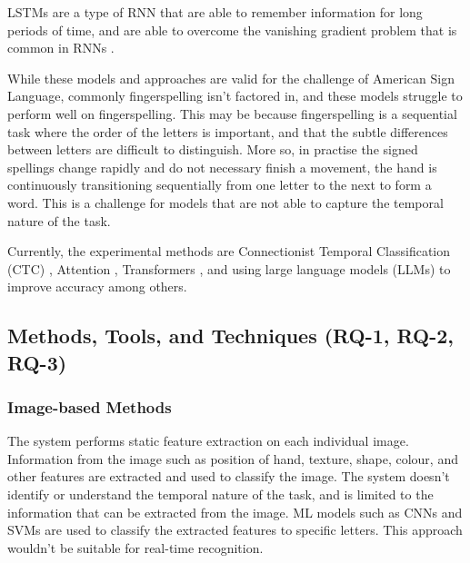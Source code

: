 LSTMs are a type of RNN that are able to remember information for long periods of time, and are able to overcome the vanishing gradient problem that is common in RNNs \cite{sherstinskyFundamentalsRecurrentNeural2020}.


While these models and approaches are valid for the challenge of American Sign Language, commonly fingerspelling isn't factored in, and these models struggle to perform well on fingerspelling. This may be because fingerspelling is a sequential task where the order of the letters is important, and that the subtle differences between letters are difficult to distinguish. More so, in practise the signed spellings change rapidly and do not necessary finish a movement, the hand is continuously transitioning sequentially from one letter to the next to form a word. This is a challenge for models that are not able to capture the temporal nature of the task.

Currently, the experimental methods are Connectionist Temporal Classification (CTC) \cite{gravesConnectionistTemporalClassification2006a, shiAmericanSignLanguage2018}, Attention \cite{bahdanauNeuralMachineTranslation2016}, Transformers \cite{vaswaniAttentionAllYou2023}, and using large language models (LLMs) to improve accuracy among others.

\begin{landscape}
    
\end{landscape}

\subsection{Methods, Tools, and Techniques (RQ-1, RQ-2, RQ-3)}

\subsubsection{Image-based Methods} %
The system performs static feature extraction on each individual image. Information from the image such as position of hand, texture, shape, colour, and other features are extracted and used to classify the image. The system doesn't identify or understand the temporal nature of the task, and is limited to the information that can be extracted from the image. ML models such as CNNs and SVMs are used to classify the extracted features to specific letters. This approach wouldn't be suitable for real-time recognition.
